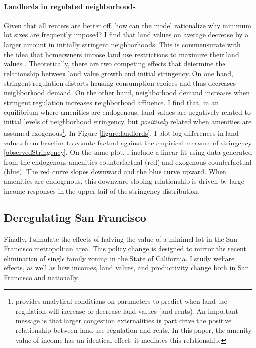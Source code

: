 \documentclass[12pt]{article}
\begin{document}
\paragraph*{Landlords in regulated neighborhoods}
Given that all renters are better off, how can the model rationalize why minimum lot sizes are frequently imposed? I find that land values on average decrease by a larger amount in initially stringent neighborhoods. This is commensurate with the idea that homeowners impose land use restrictions to maximize their land values \citep{parkho, HILBER2013, homevoterhypothesis}. Theoretically, there are two competing effects that determine the relationship between land value growth and initial stringency. On one hand, stringent regulation distorts housing consumption choices and thus decreases neighborhood demand. On the other hand, neighborhood demand increases when stringent regulation increases neighborhood affluence. I find that, in an equilibrium where amenities are endogenous, land values are negatively related to initial levels of neighborhood stringency, but \textit{positively} related when amenities are assumed exogenous\footnote{\cite{parkho} provides analytical conditions on parameters to predict when land use regulation will increase or decrease land values (and rents). An important message is that larger congestion externalities in part drive the positive relationship between land use regulation and rents. In this paper, the amenity value of income has an identical effect: it mediates this relationship.}. In Figure \ref{figure:landlords}, I plot log differences in land values from baseline to counterfactual against the empirical measure of stringency \eqref{observedStringency}. On the same plot, I include a linear fit using data generated from the endogenous amenities counterfactual (red) and exogenous counterfactual (blue). The red curve slopes downward and the blue curve upward. When amenities are endogenous, this downward sloping relationship is driven by large income responses in the upper tail of the stringency distribution. 


\subsection{Deregulating San Francisco}
\paragraph*{}
Finally, I simulate the effects of halving the value of a minimal lot in the San Francisco metropolitan area. This policy change is designed to mirror the recent elimination of single family zoning in the State of California. I study welfare effects, as well as how incomes, land values, and productivity change both in San Francisco and nationally.
\end{document}
